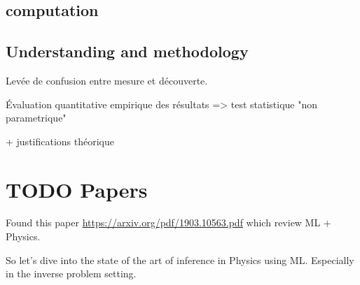 \subsection{computation} %
\label{sub:computation}

\subsection{Understanding and methodology} %
\label{sub:understanding_and_methodology}

Levée de confusion entre mesure et découverte.

Évaluation quantitative empirique des résultats => test statistique "non parametrique"

+ justifications théorique




\section{ TODO Papers }

Found this paper \url{https://arxiv.org/pdf/1903.10563.pdf} which review ML + Physics.

So let's dive into the state of the art of inference in Physics using ML.
Especially in the inverse problem setting.

